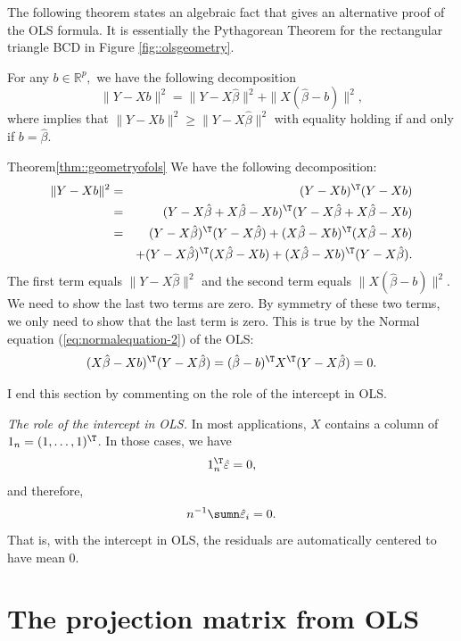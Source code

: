 The following theorem states an algebraic fact that gives an alternative proof of the OLS formula. It is essentially the Pythagorean Theorem for the rectangular
triangle BCD in Figure \ref{fig::olsgeometry}. 

\begin{theorem}\label{thm::geometryofols}
For any $b\in\mathbb{R}^{p},$ we have the following decomposition
\[
\|Y-Xb\|^{2}=\|Y-X\hat{\beta}\|^{2}+\|X(\hat{\beta}-b)\|^{2},
\]
where implies that $\|Y-Xb\|^{2}\geq\|Y-X\hat{\beta}\|^{2}$ with
equality holding if and only if $b=\hat{\beta}.$
\end{theorem}
\begin{myproof}{Theorem}{\ref{thm::geometryofols}}
We have the following decomposition: 
\begin{eqnarray*}
\|Y-Xb\|^{2} 
& =& (Y-Xb)^{\T}(Y-Xb)\\
 & =& (Y-X\hat{\beta}+X\hat{\beta}-Xb)^{\T}(Y-X\hat{\beta}+X\hat{\beta}-Xb)\\
 & =& (Y-X\hat{\beta})^{\T}(Y-X\hat{\beta})+(X\hat{\beta}-Xb)^{\T}(X\hat{\beta}-Xb)\\
 & & +(Y-X\hat{\beta})^{\T}(X\hat{\beta}-Xb)+(X\hat{\beta}-Xb)^{\T}(Y-X\hat{\beta}).
\end{eqnarray*}
The first term equals $\|Y-X\hat{\beta}\|^{2}$ and the second term equals $\|X(\hat{\beta}-b)\|^{2}$. 
We need to show the last two terms are zero. By symmetry of these
two terms, we only need to show that the last term is zero. This is
true by the Normal equation (\ref{eq:normalequation-2}) of the OLS:
\begin{align*}
(X\hat{\beta}-Xb)^{\T}(Y-X\hat{\beta}) & =(\hat{\beta}-b)^{\T}X^{\T}(Y-X\hat{\beta})=0.\\
\end{align*}
\end{myproof}



 
I end this section by commenting on the role of the intercept in OLS. 

\emph{The role of the intercept in OLS.}
In most applications,  $X$ contains a column of $1_{n}=(1,\ldots,1)^{\T}$. In those cases, we have
\[
1_{n}^{\T}\hat{\varepsilon}=0,
\]
and therefore,
\[ 
n^{-1}\sumn\hat{\varepsilon}_{i}=0.
\]
That is, with the intercept in OLS,  the residuals are automatically centered to have mean 0.  
 


\section{The projection matrix from OLS}


